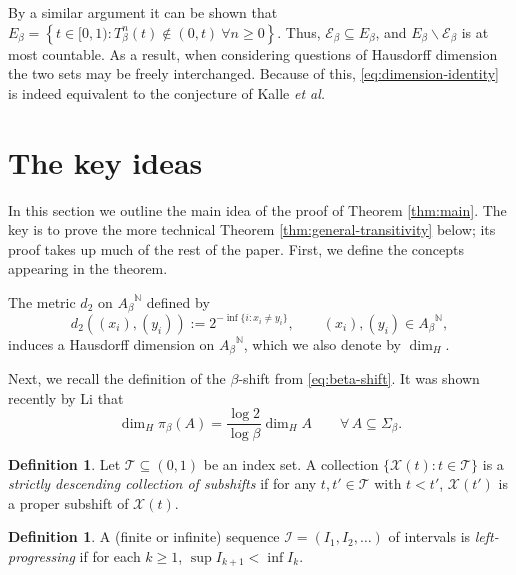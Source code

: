 \documentclass[11pt]{amsart}
\theoremstyle{definition}
\newtheorem{definition}[theorem]{Definition}
\theoremstyle{remark}
\numberwithin{equation}{section}
\newcommand{\R}{\ensuremath{\mathbb{R}}}
\newcommand{\N}{\ensuremath{\mathbb{N}}}
\newcommand{\EE}{\mathscr{E}}
\newcommand{\II}{\mathcal{I}}
\newcommand{\z}{\mathbf{z}}
\newcommand{\set}[1]{\left\{#1\right\}}
\newcommand{\f}{\infty}
\newcommand{\lle}{\preccurlyeq}
\begin{document}
By a similar argument it can be shown that $E_\beta=\set{t\in[0,1): T_\beta^n(t)\notin(0,t)~\forall n\ge 0}$. Thus, $\EE_\beta\subseteq E_\beta$, and $E_\beta\backslash \EE_\beta$ is at most countable. As a result, when considering questions of Hausdorff dimension the two sets may be freely interchanged. Because of this, \eqref{eq:dimension-identity} is indeed equivalent to the conjecture of Kalle {\em et al.}


\section{The key ideas} \label{sec:key}

In this section we outline the main idea of the proof of Theorem \ref{thm:main}. The key is to prove the more technical Theorem \ref{thm:general-transitivity} below; its proof takes up much of the rest of the paper. First, we define the concepts appearing in the theorem.

The metric $d_2$ on ${A_\beta}^\N$ defined by
\[
d_2((x_i),(y_i)):=2^{-\inf\{i:x_i\neq y_i\}}, \qquad {(x_i),(y_i)}\in{A_\beta}^\N,
\]
induces a Hausdorff dimension on ${A_\beta}^\N$, which we also denote by $\dim_H$.

Next, we recall the definition of the $\beta$-shift from \eqref{eq:beta-shift}.
It was shown recently by Li \cite[Theorem 1.1]{Li-2022} that
\begin{equation} \label{eq:Hausdorff-dimension-preserved}
\dim_H \pi_\beta(A)=\frac{\log 2}{\log\beta}\dim_H A \qquad \forall\,A\subseteq \Sigma_\beta.
\end{equation}

\begin{definition} \label{def:descending-subshifts}
Let $\mathcal{T}\subseteq(0,1)$ be an index set. A collection $\{\mathcal{X}(t): t\in\mathcal{T}\}$ is a {\em strictly descending collection of subshifts} if for any $t,t'\in\mathcal{T}$ with $t<t'$, $\mathcal{X}(t')$ is a proper subshift of $\mathcal{X}(t)$.
\end{definition}

\begin{definition} \label{def:left-progressing}
A (finite or infinite) sequence $\II=(I_1,I_2,\dots)$ of intervals is {\em left-progressing} if for each $k\geq 1$, $\sup I_{k+1}<\inf I_k$.
\end{definition}
\end{document}
